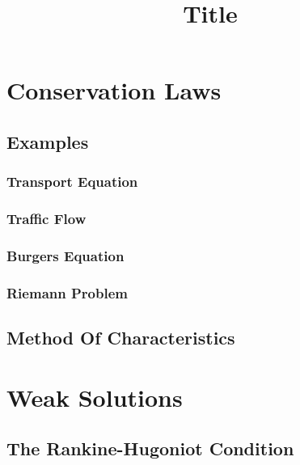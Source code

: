\documentclass[
  fourColumns,
  landscape
]{formularyETH/formularyETH}
\title{Title}
\begin{document}
\section{Conservation Laws}\label{sec:conservation_laws}
  
  \subsection{Examples}\label{subsec:examples}
    \subsubsection{Transport Equation}\label{subsec:transport_equation}
      
    \subsubsection{Traffic Flow}\label{subsec:traffic_flow}
    \subsubsection{Burgers Equation}\label{subsec:burgers_equation}
      
    \subsubsection{Riemann Problem}\label{subsubsec:riemann_problem}
      
        
    \subsection{Method Of Characteristics}\label{subsec:method_of_characteristics}
\section{Weak Solutions}
  
  
  
  \subsection{The Rankine-Hugoniot Condition}\label{subsec:}
  
\end{document}
